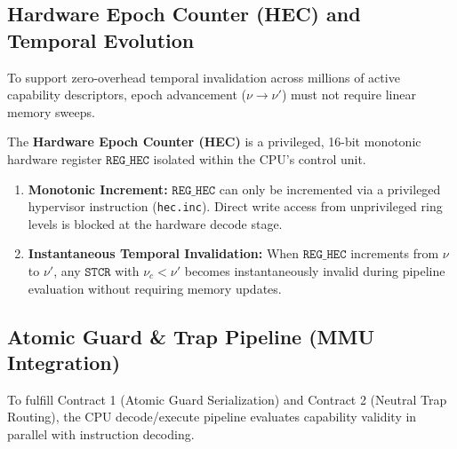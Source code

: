 \subsection{Hardware Epoch Counter (HEC) and Temporal Evolution}

To support zero-overhead temporal invalidation across millions of active capability descriptors, epoch advancement ($\nu \to \nu'$) must not require linear memory sweeps.

\begin{definition}
The \textbf{Hardware Epoch Counter (HEC)} is a privileged, 16-bit monotonic hardware register $\mathtt{REG\_HEC}$ isolated within the CPU's control unit.
\begin{enumerate}
    \item \textbf{Monotonic Increment:} $\mathtt{REG\_HEC}$ can only be incremented via a privileged hypervisor instruction (\texttt{hec.inc}). Direct write access from unprivileged ring levels is blocked at the hardware decode stage.
    \item \textbf{Instantaneous Temporal Invalidation:} When $\mathtt{REG\_HEC}$ increments from $\nu$ to $\nu'$, any $\mathtt{STCR}$ with $\nu_c < \nu'$ becomes instantaneously invalid during pipeline evaluation without requiring memory updates.
\end{enumerate}
\end{definition}

\subsection{Atomic Guard \& Trap Pipeline (MMU Integration)}

To fulfill Contract 1 (Atomic Guard Serialization) and Contract 2 (Neutral Trap Routing), the CPU decode/execute pipeline evaluates capability validity in parallel with instruction decoding.

